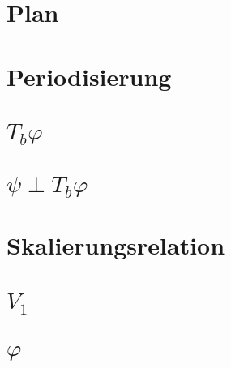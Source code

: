 %
%
%


\section{Plan}


\section{Periodisierung}
%

\section{$T_b\varphi$}
%

\section{$\psi\perp T_b\varphi$}
%

\section{Skalierungsrelation}


\section{$V_1$}


\section{$\varphi$}


